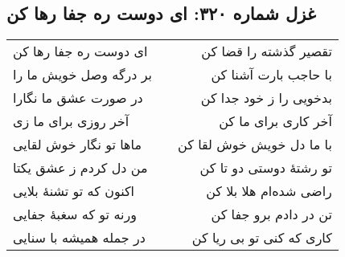 \begin{center}
\section*{غزل شماره ۳۲۰: ای دوست ره جفا رها کن}
\label{sec:320}
\begin{longtable}{l p{0.5cm} r}
ای دوست ره جفا رها کن
&&
تقصیر گذشته را قضا کن
\\
بر درگه وصل خویش ما را
&&
با حاجب بارت آشنا کن
\\
در صورت عشق ما نگارا
&&
بدخویی را ز خود جدا کن
\\
آخر روزی برای ما زی
&&
آخر کاری برای ما کن
\\
ماها تو نگار خوش لقایی
&&
با ما دل خویش خوش لقا کن
\\
من دل کردم ز عشق یکتا
&&
تو رشتهٔ دوستی دو تا کن
\\
اکنون که تو تشنهٔ بلایی
&&
راضی شده‌ام هلا بلا کن
\\
ورنه تو که سغبهٔ جفایی
&&
تن در دادم برو جفا کن
\\
در جمله همیشه با سنایی
&&
کاری که کنی تو بی ریا کن
\\
\end{longtable}
\end{center}
